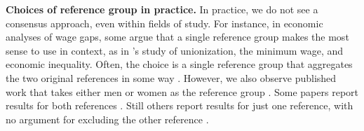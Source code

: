 
\textbf{Choices of reference group in practice.}
In practice, we do not see a consensus approach, even within fields of study.
For instance, in economic analyses of wage gaps, some argue that a single reference group makes the most sense to use in context, as in \citet{dinardoFortinLemieux1996}'s study of unionization, the minimum wage, and economic inequality.
Often, the choice is a single reference group that aggregates the two original references in some way \citep{oaxacaRansom1994,reimers1983,cotton1988,kassenboehmer2014distributional,sharafRashad2016,rahimiNazari2021,Allen2022,bachan2022genderchancellor}.
However, we also observe published work that takes either men or women as the reference group \citep{nielsen2000wage,piazzalunga2019increase,leythienne2021paygapeu,tao2024gender,paradaContzen2025}.
Some papers report results for both references \citep{ONeill2006,fortinLemieuxFirpo2011,sharafRashad2016,rahimiNazari2021}. 
Still others report results for just one reference, with no argument for excluding the other reference \citep{zhang_2019, ayubiShahbaziKhazaei2024,paradaContzen2025,singleton2016,lamJamiesonMittinty2021,leythienne2021paygapeu,alHanawiNjagi2022,tao2024gender}.

